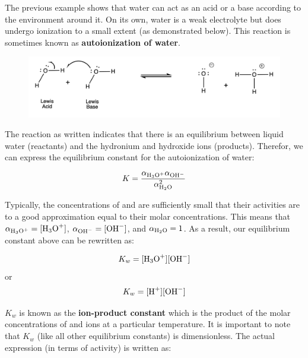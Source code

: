 \documentclass[12pt]{article}
\begin{document}
\noindent The previous example shows that water can act as an acid or a base according to the environment around it. On its own, water is a weak electrolyte but does undergo ionization to a small extent (as demonstrated below). This reaction is sometimes known as \textbf{autoionization of water}.

\begin{figure}[h] 
    \begin{centering}
	\includegraphics[width=\textwidth,trim={0 2cm 0 0},clip]{Figures/H2O-auto.png}
    \end{centering}
\end{figure}  


\noindent The reaction as written indicates that there is an equilibrium between liquid water (reactants) and the hydronium and hydroxide ions (products). Therefor, we can express the equilibrium constant for the autoionization of water:

\begin{equation}
    K = \frac{\alpha_{\ce{H3O+}}\alpha_{\ce{OH-}}}{\alpha_{\ce{H2O}}^{2}}
\end{equation}

\noindent Typically, the concentrations of  and  are sufficiently small that their activities are to a good approximation equal to their molar concentrations. This means that $\alpha_{\ce{H3O+}} = [\ce{H3O+}]$, $\alpha_{\ce{OH-}} = [\ce{OH-}]$, and $\alpha_{\ce{H2O}} = 1$. As a result, our equilibrium constant above can be rewritten as:

\begin{equation}
    K_{w} = [\ce{H3O+}][\ce{OH-}] \\
\end{equation}
\noindent or
\begin{equation}
\label{eq:K_w_expression}
    K_{w} = [\ce{H+}][\ce{OH-}]
\end{equation}

\noindent  $K_{w}$ is known as the \textbf{ion-product constant} which is the product of the molar concentrations of  and  ions at a particular temperature. It is important to note that $K_{w}$ (like all other equilibrium constants) is dimensionless. The actual expression (in terms of activity) is written as:
\end{document}
